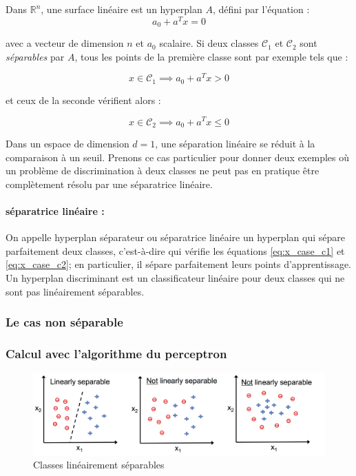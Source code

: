 		Dans $\mathbb{R}^n$, une surface linéaire est un hyperplan $A$, défini par l'équation :
		$$ 
			a_0  + a^Tx = 0
		$$
		
		avec a vecteur de dimension $n$ et $a_0$ scalaire. Si deux classes $\mathcal{C}_1$ et $\mathcal{C}_2$ sont \textit{séparables} par $A$, tous les points de la première classe sont par exemple tels que :
		
			\begin{equation}\label{eq:x_case_c1}
			 x \in \mathcal{C}_1 \implies a_0 + a^Tx > 0
			\end{equation}
		
		et ceux de la seconde vérifient alors :
		
			\begin{equation}\label{eq:x_case_c2}
				x \in \mathcal{C}_2 \implies a_0 + a^Tx \leq 0
			\end{equation}
			
		
		Dans un espace de dimension $d = 1$, une séparation linéaire se réduit à la comparaison à un seuil. Prenons ce cas particulier pour donner deux exemples où un problème de discrimination à deux classes ne peut pas en pratique être complètement résolu par une séparatrice linéaire.
		
		\paragraph* {séparatrice linéaire :}On appelle hyperplan séparateur ou séparatrice linéaire un hyperplan qui sépare parfaitement deux classes, c'est-à-dire qui vérifie les équations \ref{eq:x_case_c1} et \ref{eq:x_case_c2}; en particulier, il sépare parfaitement leurs points d'apprentissage. Un hyperplan discriminant est un classificateur linéaire pour deux classes qui ne sont pas linéairement séparables. \cite{antoine2018apprentissage}
		
		
		
		
		
		\subsubsection{Le cas non séparable}
		
		\subsubsection{Calcul avec l'algorithme du perceptron}
		
		
		
		\begin{figure}[bth]%
			\centering
			\includegraphics[width=\textwidth]{images/linearly_separable.png}
			\caption{Classes linéairement séparables \cite[image de][p. 48]{ml2008python}
			}
			\label{fig:linearly_separable}
		\end{figure}
	
